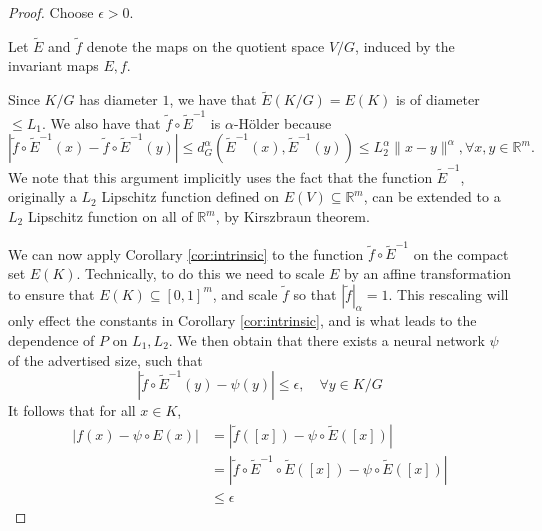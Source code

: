 \documentclass[twoside,11pt]{article}
\newcommand{\RR}{\mathbb{R}}
\begin{document}
\begin{proof}
Choose $\epsilon>0$. 

Let $\tilde E$ and $\tilde f$ denote the maps on the quotient space $V/G$, induced by the invariant maps $E,f$.

Since $K/G$ has diameter $1$, we have that $\tilde E(K/G)=E(K) $ is of diameter $\leq L_1 $. We also have that $\tilde f \circ \tilde E^{-1} $ is $\alpha$-H\"older because 
 $$|\tilde f \circ \tilde E^{-1}(x)- \tilde f \circ \tilde E^{-1}(y)|\leq  d_G^\alpha( \tilde E^{-1}(x), \tilde E^{-1}(y))\leq L_2^\alpha \|x-y\|^\alpha, \forall x,y\in \RR^m.$$
We note that this argument implicitly uses the fact that the function $\tilde E^{-1}$, originally a $L_2$ Lipschitz function defined on $E(V)\subseteq \RR^m $, can be extended to a $L_2$ Lipschitz function on all of $\RR^m$, by Kirszbraun theorem.
 
 We can now apply Corollary \ref{cor:intrinsic} to the function $\tilde f \circ \tilde E^{-1} $ on the compact set $E(K) $. Technically, to do this we need to scale $E$ by an affine transformation to ensure that $E(K)\subseteq [0,1]^m $, and scale $\tilde f$ so that $|\tilde f|_\alpha=1 $. This rescaling will only effect the constants in Corollary \ref{cor:intrinsic}, and is what leads to the dependence of $P$ on $L_1,L_2 $. We then obtain that there exists a neural network $\psi$ of the advertised size, such that 
 $$|\tilde f \circ \tilde E^{-1}(y)-\psi(y)|\leq \epsilon, \quad \forall y\in K/G $$
It follows that for all $x\in K$,
\begin{align*}|f(x)-\psi \circ E(x)|&=|\tilde f([x])-\psi \circ \tilde E([x])|\\
&=|\tilde f\circ \tilde E^{-1} \circ \tilde E([x])-\psi \circ \tilde E([x])|\\
&\leq \epsilon
\end{align*}







\end{proof}
\end{document}
